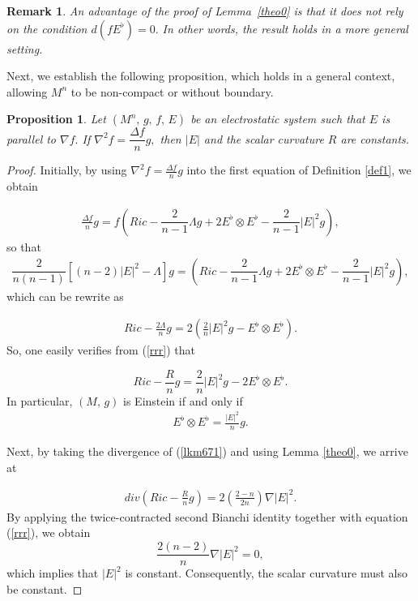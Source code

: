 \documentclass{amsart}
\newtheorem{proposition}{Proposition}
\newtheorem{remark}{Remark}
\numberwithin{equation}{section}
\begin{document}
	
	
	\begin{remark}
	An advantage of the proof of Lemma~\ref{theo0} is that it does not rely on the condition $d(fE^{\flat})=0.$ In other words, the result holds in a more general setting.
	\end{remark}
	


Next, we establish the following proposition, which holds in a  general context, allowing \( M^n \) to be non-compact or without boundary.
	

\begin{proposition}
\label{propKa}
   	Let $(M^n,\, g,\, f,\, E)$ be an electrostatic system such that $E$ is parallel to $\nabla f.$ If $\nabla^{2}f=\dfrac{\Delta f}{n}g,$ then $|E|$ and the scalar curvature $R$ are constants. 
	
	\end{proposition}

\begin{proof}
Initially, by using $\nabla^{2}f=\frac{\Delta f}{n}g$ into the first equation of Definition \ref{def1}, we obtain


	\begin{eqnarray}\label{def1Hess}
			\frac{\Delta f}{n}g = f\left({Ric} - \dfrac{2}{n-1}\Lambda g + 2E^\flat\otimes E^\flat - \dfrac{2}{n-1}|E|^2 g\right),
		\end{eqnarray} so that
\begin{eqnarray*}
			\dfrac{2}{n(n - 1)}\left[(n - 2)|E|^2 - 
			\Lambda\right]g = ({Ric} - \dfrac{2}{n-1}\Lambda g + 2E^\flat\otimes E^\flat - \dfrac{2}{n-1}|E|^2g),
		\end{eqnarray*} which can be rewrite as
		
		\begin{eqnarray}\label{6}
			{Ric} - \frac{2\Lambda}{n} g = 2\left(\frac{2}{n}\vert E\vert^{2}g - E^\flat\otimes E^\flat\right).
		\end{eqnarray} So, one easily verifies from (\ref{rrr}) that
		
		\begin{equation}
		\label{lkm671}
		Ric - \frac{R}{n}g = \frac{2}{n}|E|^2 g - 2E^\flat\otimes E^\flat.
		\end{equation} In particular, $(M,\,g)$ is Einstein if and only if 
		\begin{eqnarray*}
			E^\flat\otimes E^\flat = \frac{\vert E\vert^{2}}{n}g.
		\end{eqnarray*}
		
		
		Next, by taking the divergence of (\ref{lkm671}) and using Lemma \ref{theo0}, we arrive at
		
		\begin{eqnarray*}
		div\left(Ric - \frac{R}{n}g\right)=2\left(\frac{2-n}{2n}\right)\nabla |E|^2.
		\end{eqnarray*} By applying the twice-contracted second Bianchi identity together with equation (\ref{rrr}), we obtain $$\frac{2(n-2)}{n}\nabla |E|^2 =0,$$ which implies that $|E|^2$ is constant. Consequently, the scalar curvature must also be constant.

\end{proof}
\end{document}
